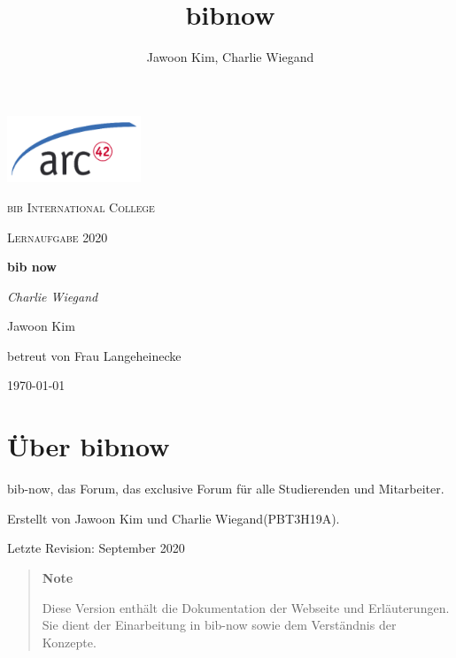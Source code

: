 \documentclass[ngerman]{scrartcl} %
\author{Jawoon Kim, Charlie Wiegand}
\begin{document}
 \begin{titlepage}
	\section{}
	\centering
	\includegraphics[width=0.3\textwidth]{images/arc42-logo.png}\par\vspace{1cm}
	{\scshape\LARGE bib International College\par}
	\vspace{1cm}
	{\rmfamily\scshape Lernaufgabe 2020\par}
	\vspace{1.5cm}
	{\Huge\bfseries bib now\par}
	\vspace{2cm}
	{\Large\itshape Charlie Wiegand\par Jawoon Kim\par}
	\vfill
	betreut von Frau Langeheinecke\par
	\vfill
	{\large \today\par}
\end{titlepage}

 \maketitle
\title{bibnow}
\vspace{2cm}

\section{Über bibnow}
bib-now, das Forum, das exclusive Forum für alle Studierenden und Mitarbeiter.

\vspace{1cm}

Erstellt von Jawoon Kim und Charlie Wiegand(PBT3H19A).

Letzte Revision: September 2020

\vspace{2cm}

\begin{quote}
\textbf{Note}

Diese Version enthält die Dokumentation der Webseite und Erläuterungen. Sie dient
der Einarbeitung in bib-now sowie dem Verständnis der Konzepte. 
\end{quote}
\end{document}
